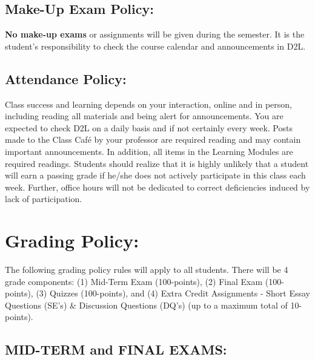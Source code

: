 \documentclass[11pt,]{article}
\begin{document}
\hypertarget{make-up-exam-policy}{%
\subsection{Make-Up Exam Policy:}\label{make-up-exam-policy}}

\textbf{No make-up exams} or assignments will be given during the semester. It is the student's responsibility to check the course calendar and announcements in D2L.

\hypertarget{attendance-policy}{%
\subsection{Attendance Policy:}\label{attendance-policy}}

Class success and learning depends on your interaction, online and in person,
including reading all materials and being alert for announcements. You are expected to check D2L
on a daily basis and if not certainly every week. Posts made to the Class Café by your professor are
required reading and may contain important announcements. In addition, all items in the Learning
Modules are required readings. Students should realize that it is highly unlikely that a student will
earn a passing grade if he/she does not actively participate in this class each week. Further, office
hours will not be dedicated to correct deficiencies induced by lack of participation.

\hypertarget{grading-policy}{%
\section{Grading Policy:}\label{grading-policy}}

The following grading policy rules will apply to all students.
There will be 4 grade components: (1) Mid-Term Exam (100-points), (2) Final Exam (100-points), (3)
Quizzes (100-points), and (4) Extra Credit Assignments - Short Essay Questions (SE's) \&
Discussion Questions (DQ's) (up to a maximum total of 10-points).

\hypertarget{mid-term-and-final-exams}{%
\subsection{MID-TERM and FINAL EXAMS:}\label{mid-term-and-final-exams}}
\end{document}
